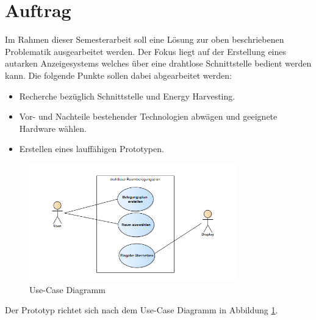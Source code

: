 \section{Auftrag}
\label{sec:generalProvision}


Im Rahmen dieser Semesterarbeit soll eine Lösung zur oben beschriebenen Problematik ausgearbeitet werden. Der Fokus liegt auf der Erstellung eines autarken Anzeigesystems welches über eine drahtlose Schnittstelle bedient werden kann. Die folgende Punkte sollen dabei abgearbeitet werden:
\begin{itemize}
	\item Recherche bezüglich Schnittstelle und Energy Harvesting.	
	\item Vor- und Nachteile bestehender Technologien abwägen und geeignete Hardware wählen.	
	\item Erstellen eines lauffähigen Prototypen.
\end{itemize}

\begin{figure}[h]
	\centering
	\includegraphics[width=0.8\textwidth]{./Use-Case-Model.png}
	\caption{Use-Case Diagramm\label{use-case}}
\end{figure}

Der Prototyp richtet sich nach dem Use-Case Diagramm in Abbildung \ref{use-case}.